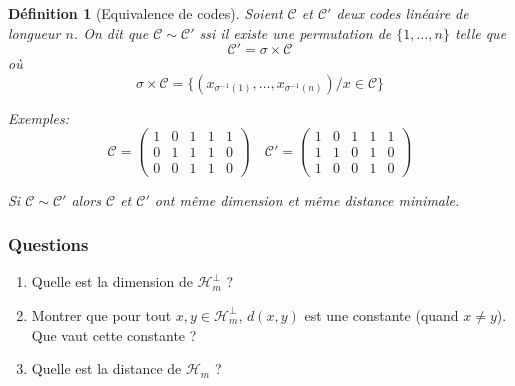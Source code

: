 \documentclass[a4paper,10pt,twocolumn]{article}
\theoremstyle{break}
\newcommand{\code}[1]{\mathcal{#1}}
\newcommand{\C}{\code{C}}
\newtheorem{mydef}{Définition}
\begin{document}
\begin{mydef}[Equivalence de codes]
 Soient $\C$ et $\C'$ deux codes linéaire de longueur $n$. On dit que $\C \sim \C'$ ssi il existe une permutation de $\{1, \ldots, n\}$ telle que
 $$ \C' = \sigma \times \C $$
 où 
 $$ \sigma \times \C = \{ (x_{\sigma^{-1}(1)}, \ldots, x_{\sigma^{-1}(n)}) / x \in \C \} $$
 
 Exemples:
 $$
\C = \begin{pmatrix}
 1 & 0 & 1 & 1 & 1 \\
 0 & 1 & 1 & 1 & 0 \\
 0 & 0 & 1 & 1 & 0 
\end{pmatrix} \quad
\C' = \begin{pmatrix}
 1 & 0 & 1 & 1 & 1 \\
 1 & 1 & 0 & 1 & 0 \\
 1 & 0 & 0 & 1 & 0
\end{pmatrix}$$

 Si $\C \sim \C'$ alors $\C$ et $\C'$ ont même dimension et même distance minimale.
\end{mydef}

\subsubsection*{Questions}
\begin{enumerate}
 \item Quelle est la dimension de $\code{H}_m^\bot$ ?
 \item Montrer que pour tout $x,y \in \code{H}_m^\bot$, $d(x,y)$ est une constante (quand $x \ne y$). Que vaut cette constante ?
 \item Quelle est la distance de $\code{H}_m$ ?
\end{enumerate}
\end{document}
